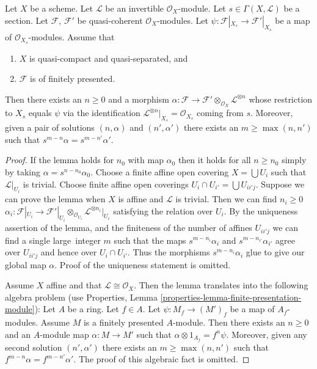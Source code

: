 \begin{lemma}
\label{lemma-section-maps-backwards}
Let $X$ be a scheme.
Let $\mathcal{L}$ be an invertible $\mathcal{O}_X$-module.
Let $s \in \Gamma(X, \mathcal{L})$ be a section.
Let $\mathcal{F}$, $\mathcal{F}'$ be quasi-coherent
$\mathcal{O}_X$-modules.
Let $\psi : \mathcal{F}|_{X_s} \to \mathcal{F}'|_{X_s}$ be a map
of $\mathcal{O}_{X_s}$-modules.
Assume that
\begin{enumerate}
\item $X$ is quasi-compact and quasi-separated, and
\item $\mathcal{F}$ is of finitely presented.
\end{enumerate}
Then there exists an $n \geq 0$ and a morphism
$\alpha : \mathcal{F} \to
\mathcal{F}' \otimes_{\mathcal{O}_X} \mathcal{L}^{\otimes n}$
whose restriction to $X_s$ equals $\psi$ via the identification
$\mathcal{L}^{\otimes n}|_{X_s} = \mathcal{O}_{X_s}$ coming from $s$.
Moreover, given a pair of solutions $(n, \alpha)$ and
$(n', \alpha')$ there exists an $m \geq \max(n, n')$
such that $s^{m - n}\alpha = s^{m - n'}\alpha'$.
\end{lemma}

\begin{proof}
If the lemma holds for $n_0$ with map $\alpha_0$
then it holds for all $n \geq n_0$
simply by taking $\alpha = s^{n - n_0} \alpha_0$.
Choose a finite affine open covering $X = \bigcup U_i$ such
that $\mathcal{L}|_{U_i}$ is trivial. Choose finite affine
open coverings $U_i \cap U_{i'} = \bigcup U_{ii'j}$.
Suppose we can prove the lemma when $X$ is affine and
$\mathcal{L}$ is trivial. Then we can find $n_i \geq 0$
$\alpha_i : \mathcal{F}|_{U_i} \to
\mathcal{F}'|_{U_i} \otimes_{\mathcal{O}_{U_i}}
\mathcal{L}^{\otimes n_i}|_{U_i}$ satisfying the relation over $U_i$.
By the uniqueness assertion of the lemma, and the finiteness of
the number of affines $U_{ii'j}$ we can find a single large\
integer $m$ such that the maps $s^{m - n_i}\alpha_i$
and $s^{m - n_{i'}}\alpha_{i'}$
agree over $U_{ii'j}$ and hence over $U_i \cap U_{i'}$.
Thus the morphisms $s^{m - n_i}\alpha_i$ glue to give our global
map $\alpha$. Proof of the uniqueness statement is omitted.

\medskip\noindent
Assume $X$ affine and that $\mathcal{L} \cong \mathcal{O}_X$. Then the lemma
translates into the following algebra problem (use Properties,
Lemma \ref{properties-lemma-finite-presentation-module}):
Let $A$ be a ring. Let $f \in A$. Let $\psi : M_f \to (M')_f$ be
a map of $A_f$-modules. Assume $M$ is a finitely presented $A$-module.
Then there exists an $n \geq 0$ and an $A$-module map
$\alpha : M \to M'$ such that $\alpha \otimes 1_{A_f} = f^n\psi$.
Moreover, given any second solution $(n', \alpha')$
there exists an $m \geq \max(n, n')$
such that $f^{m - n}\alpha = f^{m - n'}\alpha'$.
The proof of this algebraic fact is omitted.
\end{proof}

